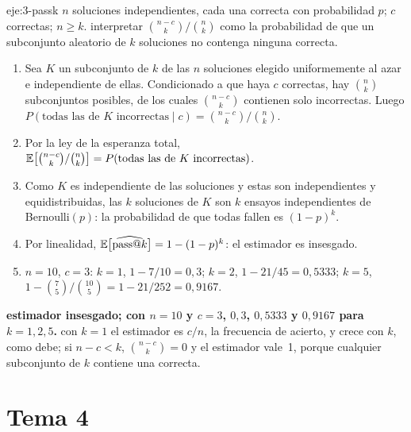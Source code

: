 \begin{solucion}{eje:3-passk}
\datos $n$ soluciones independientes, cada una correcta con probabilidad $p$; $c$ correctas; $n\ge k$.
\planteamiento interpretar $\binom{n-c}{k}/\binom{n}{k}$ como la probabilidad de que un subconjunto aleatorio de $k$ soluciones no contenga ninguna correcta.
\pasos
\begin{enumerate}[label=\arabic*.]
  \item Sea $K$ un subconjunto de $k$ de las $n$ soluciones elegido uniformemente al azar e independiente de ellas. Condicionado a que haya $c$ correctas, hay $\binom{n}{k}$ subconjuntos posibles, de los cuales $\binom{n-c}{k}$ contienen solo incorrectas. Luego $P(\text{todas las de }K\text{ incorrectas}\mid c)=\binom{n-c}{k}/\binom{n}{k}$.
  \item Por la ley de la esperanza total, $\mathbb{E}\bigl[\binom{n-c}{k}/\binom{n}{k}\bigr]=P(\text{todas las de }K\text{ incorrectas})$.
  \item Como $K$ es independiente de las soluciones y estas son independientes y equidistribuidas, las $k$ soluciones de $K$ son $k$ ensayos independientes de Bernoulli$(p)$: la probabilidad de que todas fallen es $(1-p)^{k}$.
  \item Por linealidad, $\mathbb{E}\bigl[\widehat{\text{pass@}k}\bigr]=1-(1-p)^{k}$: el estimador es insesgado.
  \item $n=10$, $c=3$: $k=1$, $1-7/10=0{,}3$; $k=2$, $1-21/45=0{,}5333$; $k=5$, $1-\binom75/\binom{10}5=1-21/252=0{,}9167$.
\end{enumerate}
\resultado \textbf{estimador insesgado; con $n=10$ y $c=3$, $0{,}3$, $0{,}5333$ y $0{,}9167$ para $k=1,2,5$.}
\comprobacion con $k=1$ el estimador es $c/n$, la frecuencia de acierto, y crece con $k$, como debe; si $n-c<k$, $\binom{n-c}{k}=0$ y el estimador vale~1, porque cualquier subconjunto de $k$ contiene una correcta.
\end{solucion}

\section{Tema 4}

